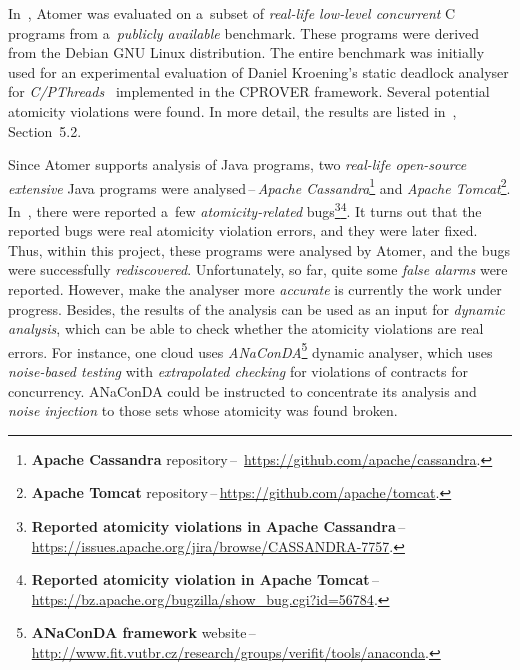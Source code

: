 In~\cite{harmimBP}, Atomer was evaluated on a~subset of \emph{real-life
low-level concurrent} C programs from a~\emph{publicly available} benchmark.
These programs were derived from the Debian GNU Linux distribution. The entire
benchmark was initially used for an experimental evaluation of Daniel
Kroening's static deadlock analyser for
\emph{C/PThreads}~\cite{deadlockKroening} implemented in the CPROVER framework. 
Several potential atomicity violations were found. In more detail, the results
are listed in~\cite{harmimBP}, Section~5.2.

Since Atomer supports analysis of Java programs, two \emph{real-life open-source
extensive} Java programs were analysed\,--\,\emph{Apache Cassandra}\footnote{%
\textbf{Apache Cassandra} repository\,--\,%
\url{https://github.com/apache/cassandra}.} and \emph{Apache Tomcat}\footnote{%
\textbf{Apache Tomcat} repository\,--\,\url{https://github.com/apache/tomcat}.}.
In~\cite{contracts2015, contracts2017}, there were reported a~few
\emph{atomicity-related} bugs\footnote{\textbf{Reported atomicity violations
in Apache Cassandra}\,--\,%
\url{https://issues.apache.org/jira/browse/CASSANDRA-7757}.}\footnote{\textbf{%
Reported atomicity violation in Apache Tomcat}\,--\,%
\url{https://bz.apache.org/bugzilla/show_bug.cgi?id=56784}.}. It turns out that
the reported bugs were real atomicity violation errors, and they were later
fixed. Thus, within this project, these programs were analysed by Atomer, and
the bugs were successfully \emph{rediscovered}. Unfortunately, so far, quite
some \emph{false alarms} were reported. However, make the analyser more
\emph{accurate} is currently the work under progress. Besides, the results
of the analysis can be used as an input for \emph{dynamic analysis}, which
can be able to check whether the atomicity violations are real errors. For
instance, one cloud uses \emph{ANaConDA}\footnote{\textbf{ANaConDA framework}
website\,--\,%
\url{http://www.fit.vutbr.cz/research/groups/verifit/tools/anaconda}.} dynamic
analyser, which uses \emph{noise-based testing} with \emph{extrapolated
checking} for violations of contracts for concurrency. ANaConDA could be
instructed to concentrate its analysis and \emph{noise injection} to those
sets whose atomicity was found broken.


